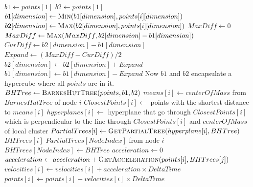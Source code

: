 \documentclass{article}
\begin{document}
\begin{algorithm}
\caption{}
\begin{algorithmic}[1]
		\State $b1 \gets points[1]$
		\State $b2 \gets points[1]$
				\State $b1[dimension] \gets \Call{Min}{b1[dimension], points[i][dimension]}$
				\State $b2[dimension] \gets \Call{Max}{b2[dimension], points[i][dimension]}$
			\EndFor
		\EndFor
		\State $MaxDiff \gets 0$
			$MaxDiff \gets \Call{Max}{MaxDiff, b2[dimension] - b1[dimension]}$
		\EndFor
			\State $CurDiff \gets b2[dimension] - b1[dimension]$
			\State $Expand \gets (MaxDiff - CurDiff) / 2$
			\State $b2[dimension] \gets b2[dimension] + Expand$
			\State $b1[dimension] \gets b1[dimension] - Expand$
		\EndFor \Comment Now $b1$ and $b2$ encapsulate a hypercube where all $points$ are in it.
		\State $BHTree \gets \Call{BarnesHutTree}{points, b1, b2}$
			\State $means[i] \gets centerOfMass$ from $BarnesHutTree$ of node $i$
			\State $ClosestPoints[i] \gets$ points with the shortest distance to $means[i]$
		\EndFor
			\State $hyperplanes[i] \gets$ hyperplane that go through $ClosestPoints[i]$ which is
			perpendicular to the line through $ClosestPoints[i]$ and $centerOfMass$ of local cluster
		\EndFor
			\State $PartialTrees[i] \gets \Call{GetPartialTree}{hyperplane[i], BHTree}$
		\EndFor
				\State $BHTrees[i]$ $PartialTrees[NodeIndex]$ from node $i$
			\EndIf
		\EndFor
		\State $BHTrees[NodeIndex] \gets BHTree$
			\State $acceleration \gets 0$
				\State $acceleration \gets acceleration + \Call{GetAcceleration}{points[i],
				BHTrees[j]}$
			\EndFor
			\State $velocities[i] \gets velocities[i] + acceleration \times DeltaTime$
			\State $points[i] \gets points[i] + velocities[i] \times DeltaTime$
		\EndFor
	\EndFunction
\end{algorithmic}
\end{algorithm}
\end{document}
